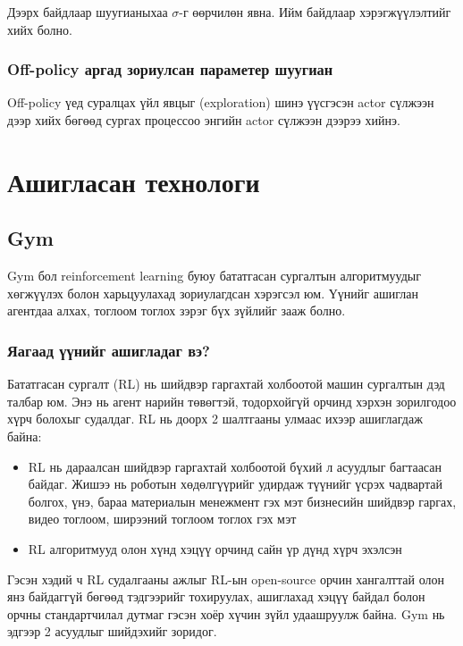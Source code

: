 \documentclass[12pt,A4]{report}
\begin{document}
Дээрх байдлаар шуугианыхаа $\sigma$-г өөрчилөн явна. Ийм байдлаар хэрэгжүүлэлтийг хийх болно.

\subsubsection{Off-policy аргад зориулсан параметер шуугиан}

Off-policy үед суралцах үйл явцыг (exploration) шинэ үүсгэсэн actor сүлжээн дээр хийх бөгөөд сургах процессоо энгийн actor сүлжээн дээрээ хийнэ.

\section{Ашигласан технологи}

\subsection{Gym}

Gym бол reinforcement learning буюу бататгасан сургалтын алгоритмуудыг хөгжүүлэх болон харьцуулахад зориулагдсан хэрэгсэл юм. Үүнийг ашиглан агентдаа алхах, тоглоом тоглох зэрэг бүх зүйлийг зааж болно. 

\subsubsection{Яагаад үүнийг ашигладаг вэ?}

Бататгасан сургалт (RL) нь шийдвэр гаргахтай холбоотой машин сургалтын дэд талбар юм. Энэ нь агент нарийн төвөгтэй, тодорхойгүй орчинд хэрхэн зорилгодоо хүрч болохыг судалдаг. RL нь доорх 2 шалтгааны улмаас ихээр ашиглагдаж байна:

\begin{itemize}
	\item RL нь дараалсан шийдвэр гаргахтай холбоотой бүхий л асуудлыг багтаасан байдаг. Жишээ нь роботын хөдөлгүүрийг удирдаж түүнийг үсрэх чадвартай болгох, үнэ, бараа материалын менежмент гэх мэт бизнесийн шийдвэр гаргах, видео тоглоом, ширээний тоглоом тоглох гэх мэт
	\item RL алгоритмууд олон хүнд хэцүү орчинд сайн үр дүнд хүрч эхэлсэн
\end{itemize} 

Гэсэн хэдий ч RL судалгааны ажлыг RL-ын open-source орчин хангалттай олон янз байдаггүй бөгөөд тэдгээрийг тохируулах, ашиглахад хэцүү байдал болон орчны стандартчилал дутмаг гэсэн хоёр хүчин зүйл удаашруулж байна. Gym нь эдгээр 2 асуудлыг шийдэхийг зоридог.
\end{document}
